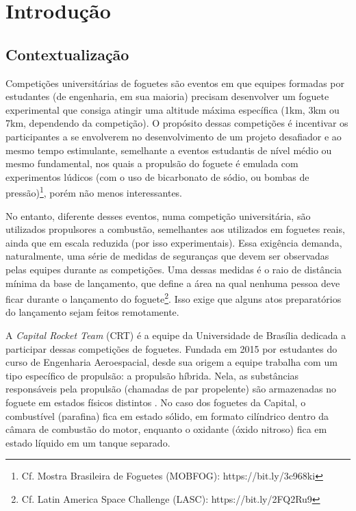 \part{Introdução}

\chapter[Contextualização]{Contextualização}

\par Competições universitárias de foguetes são eventos em que equipes formadas por estudantes (de engenharia, em sua maioria) precisam desenvolver um foguete experimental que consiga atingir uma altitude máxima específica (1km, 3km ou 7km, dependendo da competição). O propósito dessas competições é incentivar os participantes a se envolverem no desenvolvimento de um projeto desafiador e ao mesmo tempo estimulante, semelhante a eventos estudantis de nível médio ou mesmo fundamental, nos quais a propulsão do foguete é emulada com experimentos lúdicos (com o uso de bicarbonato de sódio, ou bombas de pressão)\footnote{Cf. Mostra Brasileira de Foguetes (MOBFOG): https://bit.ly/3c968ki}, porém não menos interessantes.

\par No entanto, diferente desses eventos, numa competição universitária, são utilizados propulsores a combustão, semelhantes aos utilizados em foguetes reais, ainda que em escala reduzida (por isso experimentais). Essa exigência demanda, naturalmente, uma série de medidas de seguranças que devem ser observadas pelas equipes durante as competições. Uma dessas medidas é o raio de distância mínima da base de lançamento, que define a área na qual nenhuma pessoa deve ficar durante o lançamento do foguete\footnote{Cf. Latin America Space Challenge (LASC): https://bit.ly/2FQ2Ru9}. Isso exige que alguns atos preparatórios do lançamento sejam feitos remotamente.

\par A \textit{Capital Rocket Team} (CRT) é a equipe da Universidade de Brasília dedicada a participar dessas competições de foguetes. Fundada em 2015 por estudantes do curso de Engenharia Aeroespacial, desde sua origem a equipe trabalha com um tipo específico de propulsão: a propulsão híbrida. Nela, as substâncias responsáveis pela propulsão (chamadas de par propelente) são armazenadas no foguete em estados físicos distintos \cite{sutton}. No caso dos foguetes da Capital, o combustível (parafina) fica em estado sólido, em formato cilíndrico dentro da câmara de combustão do motor, enquanto o oxidante (óxido nitroso) fica em estado líquido em um tanque separado.

